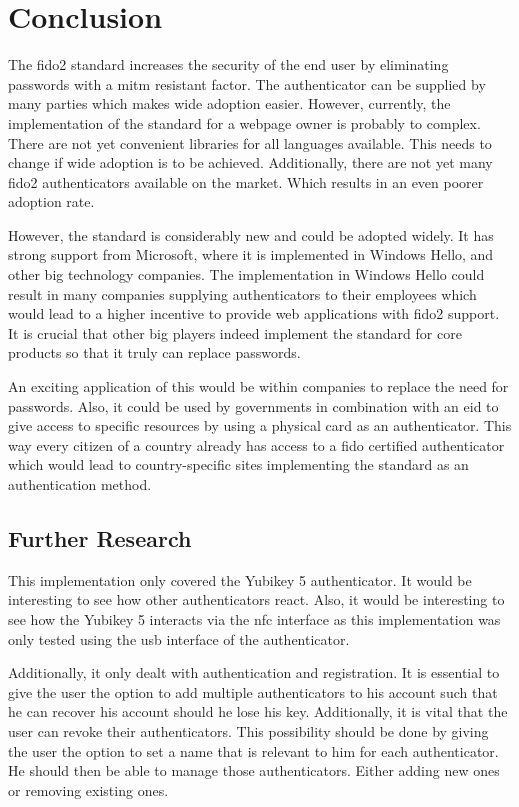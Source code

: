 \documentclass[a4paper, 11pt]{scrartcl}
\begin{document}
\section{Conclusion}
The \gls{fido2} standard increases the security of the end user by eliminating passwords with a \gls{mitm} resistant factor. The authenticator can be supplied by many parties which makes wide adoption easier. However, currently, the implementation of the standard for a webpage owner is probably to complex. There are not yet convenient libraries for all languages available. This needs to change if wide adoption is to be achieved. Additionally, there are not yet many \gls{fido2} authenticators available on the market. Which results in an even poorer adoption rate. 

However, the standard is considerably new and could be adopted widely. It has strong support from Microsoft, where it is implemented in Windows Hello, and other big technology companies. The implementation in Windows Hello could result in many companies supplying authenticators to their employees which would lead to a higher incentive to provide web applications with \gls{fido2} support. It is crucial that other big players indeed implement the standard for core products so that it truly can replace passwords.

An exciting application of this would be within companies to replace the need for passwords. Also, it could be used by governments in combination with an \gls{eid} to give access to specific resources by using a physical card as an authenticator. This way every citizen of a country already has access to a \gls{fido} certified authenticator which would lead to country-specific sites implementing the standard as an authentication method. 

\subsection{Further Research}

This implementation only covered the Yubikey 5 authenticator. It would be interesting to see how other authenticators react. Also, it would be interesting to see how the Yubikey 5 interacts via the \gls{nfc} interface as this implementation was only tested using the \gls{usb} interface of the authenticator. 

Additionally, it only dealt with authentication and registration. It is essential to give the user the option to add multiple authenticators to his account such that he can recover his account should he lose his key. Additionally, it is vital that the user can revoke their authenticators. This possibility should be done by giving the user the option to set a name that is relevant to him for each authenticator. He should then be able to manage those authenticators. Either adding new ones or removing existing ones. 


\clearpage

\printglossaries

\clearpage

\printbibliography[heading=bibintoc]
\end{document}
